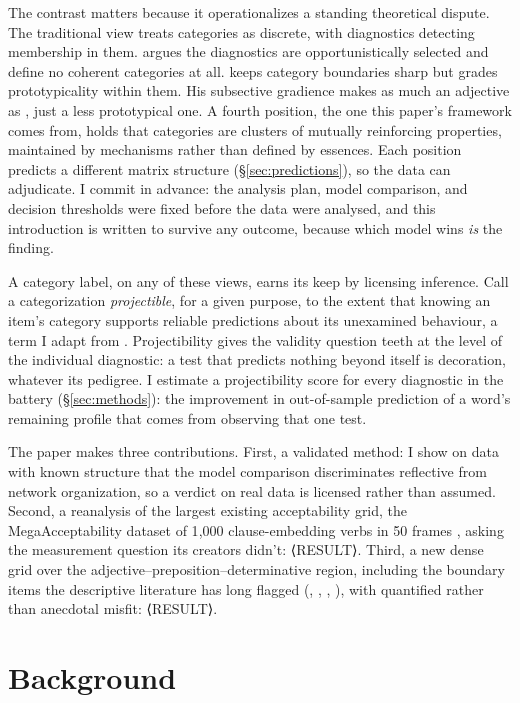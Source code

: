 \documentclass[12pt]{article}
\begin{document}
The contrast matters because it operationalizes a standing theoretical
dispute. The traditional view treats categories as discrete, with
diagnostics detecting membership in them. \textcite{croft2001} argues the
diagnostics are opportunistically selected and define no coherent
categories at all. \textcite{aarts2007} keeps category boundaries sharp
but grades prototypicality within them. His subsective gradience makes
 as much an adjective as , just a less
prototypical one. A fourth position, the one this paper's framework comes
from, holds that categories are clusters of mutually reinforcing
properties, maintained by mechanisms rather than defined by essences.
Each position predicts a different matrix structure
(\S\ref{sec:predictions}), so the data can adjudicate. I commit in
advance: the analysis plan, model
comparison, and decision thresholds were fixed before the data were
analysed, and this introduction is written to survive any outcome,
because which model wins \emph{is} the finding.

A category label, on any of these views, earns its keep by licensing
inference. Call a categorization \emph{projectible}, for a given purpose,
to the extent that knowing an item's category supports reliable
predictions about its unexamined behaviour, a term I adapt from
\textcite{goodman1955}. Projectibility gives the validity question teeth
at the level of the individual diagnostic: a test that predicts nothing
beyond itself is decoration, whatever its pedigree. I estimate a
projectibility score for every diagnostic in the battery
(\S\ref{sec:methods}): the improvement in out-of-sample prediction of a
word's remaining profile that comes from observing that one test.

The paper makes three contributions. First, a validated method: I show
on data with known structure that the model comparison discriminates
reflective from network organization, so a verdict on real data is
licensed rather than assumed. Second, a reanalysis of the largest
existing acceptability grid, the MegaAcceptability dataset of 1{,}000
clause-embedding verbs in 50 frames \parencite{whiterawlins2016},
asking the measurement question its creators didn't: ⟨RESULT⟩. Third, a
new dense grid over the adjective--preposition--determinative region,
including the boundary items the descriptive literature has long
flagged (, , , ),
with quantified rather than anecdotal misfit: ⟨RESULT⟩.

\section{Background}\label{sec:background}
\end{document}
